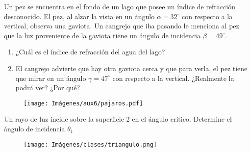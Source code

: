 \documentclass[letterpaper,11pt]{article}
\begin{document}
\begin{enumerate}
    


    

\begin{minipage}{0.6\linewidth}
    \item Un pez se encuentra en el fondo de un lago que posee un índice de refracción desconocido. El pez, al alzar la vista en un ángulo $\alpha = 32^{\circ}$ con respecto a la vertical, observa una gaviota. Un cangrejo que iba pasando le menciona al pez que la luz proveniente de la gaviota tiene un ángulo de incidencia $\beta = 49^{\circ}$.
    
    \begin{enumerate}
        \item ¿Cuál es el índice de refracción del agua del lago?
        
        \item El cangrejo advierte que hay otra gaviota cerca y que para verla, el pez tiene que mirar en un ángulo $\gamma = 47^{\circ}$ con respecto a la vertical. ¿Realmente la podrá ver? ¿Por qué?
    \end{enumerate}
\end{minipage}
\hfill
\begin{minipage}{0.35\linewidth}
    \begin{figure}[H]
        \centering
        \texttt{[image: Imágenes/aux6/pajaros.pdf]}
    \end{figure}
\end{minipage}

\item Un rayo de luz incide sobre la superficie 2 en el ángulo crítico. Determine el ángulo de incidencia $\theta_1$

\begin{figure}[H]
    \centering
    \texttt{[image: Imágenes/clases/triangulo.png]}
\end{figure}

\end{enumerate}
\end{document}
